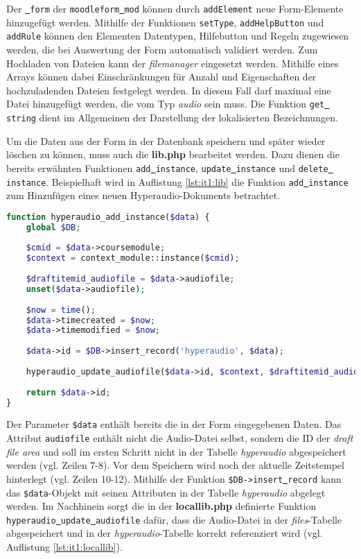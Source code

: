 Der \texttt{\underline{{ }}form} der \texttt{moodleform\underline{{ }}mod} können durch \texttt{addElement} neue Form-Elemente hinzugefügt werden. Mithilfe der Funktionen \texttt{setType}, \texttt{addHelpButton} und \texttt{addRule} können den Elementen Datentypen, Hilfebutton und Regeln zugewiesen werden, die bei Auswertung der Form automatisch validiert werden. Zum Hochladen von Dateien kann der \textit{filemanager} eingesetzt werden. Mithilfe eines Arrays können dabei Einschränkungen für Anzahl und Eigenschaften der hochzuladenden Dateien festgelegt werden. In diesem Fall darf maximal eine Datei hinzugefügt werden, die vom Typ \textit{audio} sein muss. Die Funktion \texttt{get\underline{{ }}string} dient im Allgemeinen der Darstellung der lokalisierten Bezeichnungen.

Um die Daten aus der Form in der Datenbank speichern und später wieder löschen zu können, muss auch die \textbf{lib.php} bearbeitet werden. Dazu dienen die bereits erwähnten Funktionen \texttt{add\underline{{ }}instance}, \texttt{update\underline{{ }}instance} und \texttt{delete\underline{{ }}instance}. Beispielhaft wird in Auflistung \ref{lst:it1:lib} die Funktion \texttt{add\underline{{ }}instance} zum Hinzufügen eines neuen Hyperaudio-Dokuments betrachtet. 

\begin{lstlisting}[language=php,
             linewidth=\textwidth,
             caption={Ausschnitt der \textbf{lib.php} in der 1. Iteration},
             label={lst:it1:lib}]
function hyperaudio_add_instance($data) {
    global $DB;
    
    $cmid = $data->coursemodule;
    $context = context_module::instance($cmid);
    
    $draftitemid_audiofile = $data->audiofile;
    unset($data->audiofile);
     
    $now = time();
    $data->timecreated = $now;
    $data->timemodified = $now;
    
    $data->id = $DB->insert_record('hyperaudio', $data);
    
    hyperaudio_update_audiofile($data->id, $context, $draftitemid_audiofile);
     
    return $data->id;
}
\end{lstlisting}

Der Parameter \texttt{\$data} enthält bereits die in der Form eingegebenen Daten. Das Attribut \mbox{\texttt{audiofile}} enthält nicht die Audio-Datei selbst, sondern die ID der \textit{draft file area} und soll im ersten Schritt nicht in der Tabelle \textit{hyperaudio} abgespeichert werden (vgl. Zeilen 7-8). Vor dem Speichern wird noch der aktuelle Zeitstempel hinterlegt (vgl. Zeilen 10-12). Mithilfe der Funktion \mbox{\texttt{\$DB->insert\underline{{ }}record}} kann das \texttt{\$data}-Objekt mit seinen Attributen in der Tabelle \textit{hyperaudio} abgelegt werden. Im Nachhinein sorgt die in der \textbf{locallib.php} definierte Funktion \mbox{\texttt{hyperaudio\underline{{ }}update\underline{{ }}audiofile}} dafür, dass die Audio-Datei in der \textit{files}-Tabelle abgespeichert und in der \textit{hyperaudio}-Tabelle korrekt referenziert wird (vgl. Auflistung \ref{lst:it1:locallib}).

